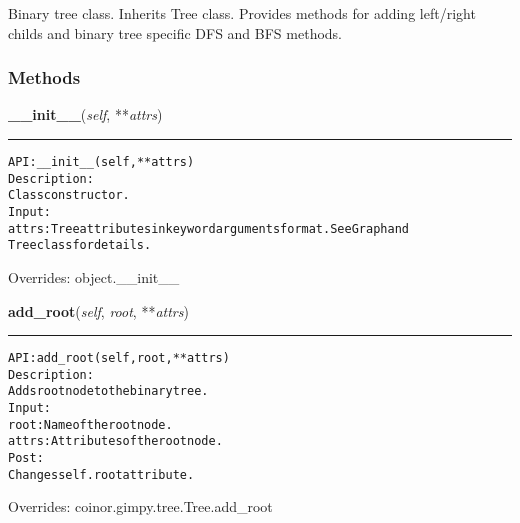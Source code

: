 Binary tree class. Inherits Tree class. Provides methods for adding 
left/right childs and binary tree specific DFS and BFS methods.



  \subsubsection{Methods}

    \vspace{0.5ex}

\hspace{.8\funcindent}\begin{boxedminipage}{\funcwidth}

    \raggedright \textbf{\_\_init\_\_}(\textit{self}, **\textit{attrs})

    \vspace{-1.5ex}

    \rule{\textwidth}{0.5\fboxrule}
\setlength{\parskip}{2ex}
\begin{alltt}

API: \_\_init\_\_(self, **attrs)
Description:
    Class constructor.
Input:
    attrs: Tree attributes in keyword arguments format. See Graph and
    Tree class for details.
\end{alltt}

\setlength{\parskip}{1ex}
      Overrides: object.\_\_init\_\_

    \end{boxedminipage}

    \vspace{0.5ex}

\hspace{.8\funcindent}\begin{boxedminipage}{\funcwidth}

    \raggedright \textbf{add\_root}(\textit{self}, \textit{root}, **\textit{attrs})

    \vspace{-1.5ex}

    \rule{\textwidth}{0.5\fboxrule}
\setlength{\parskip}{2ex}
\begin{alltt}

API: add\_root(self, root, **attrs)
Description:
    Adds root node to the binary tree.
Input:
    root: Name of the root node.
    attrs: Attributes of the root node.
Post:
    Changes self.root attribute.
\end{alltt}

\setlength{\parskip}{1ex}
      Overrides: coinor.gimpy.tree.Tree.add\_root

    \end{boxedminipage}

